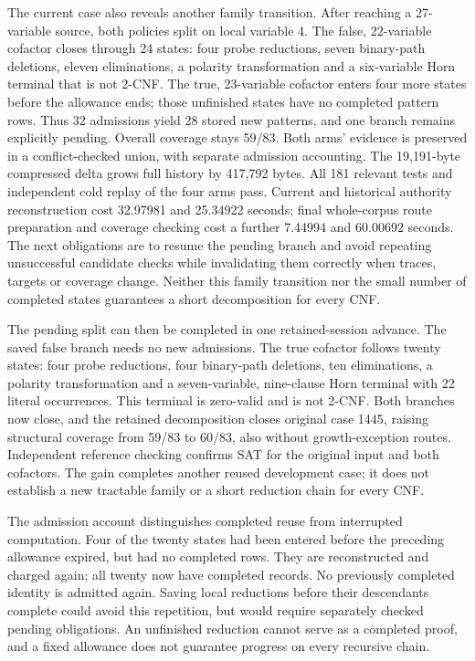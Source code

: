 \documentclass[11pt,a4paper]{article}
\numberwithin{equation}{section}
\theoremstyle{plain}
\theoremstyle{definition}
\theoremstyle{remark}
\begin{document}
The current case also reveals another family transition. After reaching a 27-variable source, both policies split on local variable 4. The false, 22-variable cofactor closes through 24 states: four probe reductions, seven binary-path deletions, eleven eliminations, a polarity transformation and a six-variable Horn terminal that is not 2-CNF. The true, 23-variable cofactor enters four more states before the allowance ends; those unfinished states have no completed pattern rows. Thus 32 admissions yield 28 stored new patterns, and one branch remains explicitly pending. Overall coverage stays 59/83. Both arms' evidence is preserved in a conflict-checked union, with separate admission accounting. The 19,191-byte compressed delta grows full history by 417,792 bytes. All 181 relevant tests and independent cold replay of the four arms pass. Current and historical authority reconstruction cost 32.97981 and 25.34922 seconds; final whole-corpus route preparation and coverage checking cost a further 7.44994 and 60.00692 seconds. The next obligations are to resume the pending branch and avoid repeating unsuccessful candidate checks while invalidating them correctly when traces, targets or coverage change. Neither this family transition nor the small number of completed states guarantees a short decomposition for every CNF.

The pending split can then be completed in one retained-session advance. The saved false branch needs no new admissions. The true cofactor follows twenty states: four probe reductions, four binary-path deletions, ten eliminations, a polarity transformation and a seven-variable, nine-clause Horn terminal with 22 literal occurrences. This terminal is zero-valid and is not 2-CNF. Both branches now close, and the retained decomposition closes original case 1445, raising structural coverage from 59/83 to 60/83, also without growth-exception routes. Independent reference checking confirms SAT for the original input and both cofactors. The gain completes another reused development case; it does not establish a new tractable family or a short reduction chain for every CNF.

The admission account distinguishes completed reuse from interrupted computation. Four of the twenty states had been entered before the preceding allowance expired, but had no completed rows. They are reconstructed and charged again; all twenty now have completed records. No previously completed identity is admitted again. Saving local reductions before their descendants complete could avoid this repetition, but would require separately checked pending obligations. An unfinished reduction cannot serve as a completed proof, and a fixed allowance does not guarantee progress on every recursive chain.
\end{document}

